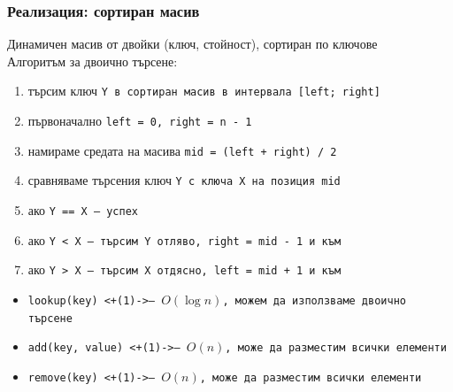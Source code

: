 \documentclass[alsotrans]{beamerswitch}
\begin{document}
\begin{frame}
  \frametitle{Реализация: сортиран масив}
  Динамичен масив от двойки (ключ, стойност), сортиран по ключове\\
  \pause
  Алгоритъм за двоично търсене:
  \begin{enumerate}
  \item търсим ключ \tt Y в сортиран масив в интервала \tt{[left; right]}
  \item първоначално \tt{left = 0}, \tt{right = n - 1}
  \item\label{it:start}  намираме средата на масива \tt{mid = (left + right) / 2}
  \item сравняваме търсения ключ \tt Y с ключа \tt X на позиция mid
  \item ако \tt{Y == X} --- успех
  \item ако \tt{Y < X} --- търсим \tt Y отляво, \tt{right = mid - 1} и към \ballref{\ref{it:start}}
  \item ако \tt{Y > X} --- търсим \tt X отдясно, \tt{left = mid + 1} и към \ballref{\ref{it:start}}
  \end{enumerate}
  \pause
  \begin{itemize}
  \item \tt{lookup(key)} \onslide<+(1)->{--- $O(\log n)$, можем да използваме двоично търсене}
  \item \tt{add(key, value)} \onslide<+(1)->{--- $O(n)$, може да разместим всички елементи}
  \item \tt{remove(key)} \onslide<+(1)->{--- $O(n)$, може да разместим всички елементи}
  \end{itemize}
\end{frame}
\end{document}
